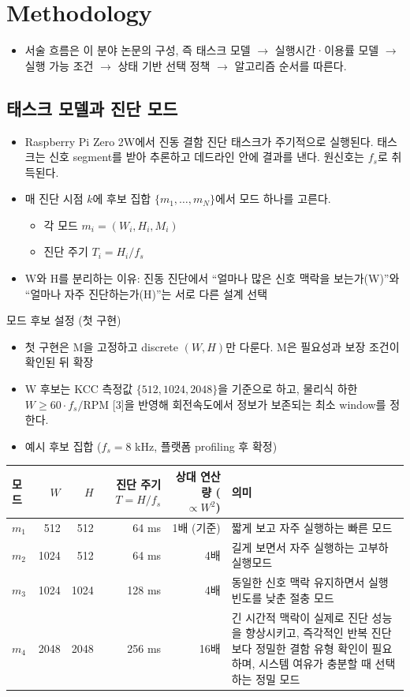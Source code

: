 \documentclass[10pt]{article}
\begin{document}
\section{Methodology}
\begin{itemize}
\item 서술 흐름은 이 분야 논문의 구성, 즉 태스크 모델 $\rightarrow$ 실행시간·이용률 모델 $\rightarrow$ 실행 가능 조건 $\rightarrow$ 상태 기반 선택 정책 $\rightarrow$ 알고리즘 순서를 따른다.
\end{itemize}
\subsection{태스크 모델과 진단 모드}
\begin{itemize}
\item Raspberry Pi Zero 2W에서 진동 결함 진단 태스크가 주기적으로 실행된다. 태스크는 신호 segment를 받아 추론하고 데드라인 안에 결과를 낸다. 원신호는 $f_s$로 취득된다.
\item 매 진단 시점 $k$에 후보 집합 $\{m_1, \dots, m_N\}$에서 모드 하나를 고른다.
\begin{itemize}
\item 각 모드 $m_i = (W_i, H_i, M_i)$
\item 진단 주기 $T_i = H_i / f_s$
\end{itemize}
\item W와 H를 분리하는 이유: 진동 진단에서 ``얼마나 많은 신호 맥락을 보는가(W)''와 ``얼마나 자주 진단하는가(H)''는 서로 다른 설계 선택
\end{itemize}
\noindent 모드 후보 설정 (첫 구현)
\begin{itemize}
\item 첫 구현은 M을 고정하고 discrete $(W, H)$만 다룬다. M은 필요성과 보장 조건이 확인된 뒤 확장
\item W 후보는 KCC 측정값 $\{512, 1024, 2048\}$을 기준으로 하고, 물리식 하한 $W \ge 60 \cdot f_s/\mathrm{RPM}$ [3]을 반영해 회전속도에서 정보가 보존되는 최소 window를 정한다.
\item 예시 후보 집합 ($f_s = 8$ kHz, 플랫폼 profiling 후 확정)
\end{itemize}
\begin{center}\footnotesize
\begin{tabular}{@{}lrrrrL{5.8cm}@{}}
\toprule
모드 & $W$ & $H$ & 진단 주기 $T = H/f_s$ & 상대 연산량 ($\propto W^2$) & 의미 \\ \midrule
$m_1$ & 512 & 512 & 64 ms & 1배 (기준) & 짧게 보고 자주 실행하는 빠른 모드 \\
$m_2$ & 1024 & 512 & 64 ms & 4배 & 길게 보면서 자주 실행하는 고부하 실행모드 \\
$m_3$ & 1024 & 1024 & 128 ms & 4배 & 동일한 신호 맥락 유지하면서 실행 빈도를 낮춘 절충 모드 \\
$m_4$ & 2048 & 2048 & 256 ms & 16배 & 긴 시간적 맥락이 실제로 진단 성능을 향상시키고, 즉각적인 반복 진단보다 정밀한 결함 유형 확인이 필요하며, 시스템 여유가 충분할 때 선택하는 정밀 모드 \\
\bottomrule
\end{tabular}
\end{center}
\end{document}
